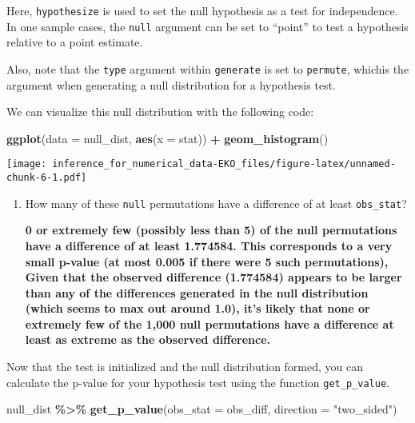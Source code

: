 \documentclass[
]{article}
\newenvironment{Shaded}{\begin{snugshade}}{\end{snugshade}}
\newcommand{\AttributeTok}[1]{\textcolor[rgb]{0.13,0.29,0.53}{#1}}
\newcommand{\FunctionTok}[1]{\textcolor[rgb]{0.13,0.29,0.53}{\textbf{#1}}}
\newcommand{\NormalTok}[1]{#1}
\newcommand{\SpecialCharTok}[1]{\textcolor[rgb]{0.81,0.36,0.00}{\textbf{#1}}}
\newcommand{\StringTok}[1]{\textcolor[rgb]{0.31,0.60,0.02}{#1}}
\begin{document}
Here, \texttt{hypothesize} is used to set the null hypothesis as a test
for independence. In one sample cases, the \texttt{null} argument can be
set to ``point'' to test a hypothesis relative to a point estimate.

Also, note that the \texttt{type} argument within \texttt{generate} is
set to \texttt{permute}, whichis the argument when generating a null
distribution for a hypothesis test.

We can visualize this null distribution with the following code:

\begin{Shaded}
\begin{Highlighting}[]
\FunctionTok{ggplot}\NormalTok{(}\AttributeTok{data =}\NormalTok{ null\_dist, }\FunctionTok{aes}\NormalTok{(}\AttributeTok{x =}\NormalTok{ stat)) }\SpecialCharTok{+}
  \FunctionTok{geom\_histogram}\NormalTok{()}
\end{Highlighting}
\end{Shaded}

\texttt{[image: inference\_for\_numerical\_data-EKO\_files/figure-latex/unnamed-chunk-6-1.pdf]}

\begin{enumerate}
\def\labelenumi{\arabic{enumi}.}
\setcounter{enumi}{5}
\item
  How many of these \texttt{null} permutations have a difference of at
  least \texttt{obs\_stat}?

  \textbf{0 or extremely few (possibly less than 5) of the null
  permutations have a difference of at least 1.774584. This corresponds
  to a very small p-value (at most 0.005 if there were 5 such
  permutations), Given that the observed difference (1.774584) appears
  to be larger than any of the differences generated in the null
  distribution (which seems to max out around 1.0), it's likely that
  none or extremely few of the 1,000 null permutations have a difference
  at least as extreme as the observed difference.}
\end{enumerate}

Now that the test is initialized and the null distribution formed, you
can calculate the p-value for your hypothesis test using the function
\texttt{get\_p\_value}.

\begin{Shaded}
\begin{Highlighting}[]
\NormalTok{null\_dist }\SpecialCharTok{\%\textgreater{}\%}
  \FunctionTok{get\_p\_value}\NormalTok{(}\AttributeTok{obs\_stat =}\NormalTok{ obs\_diff, }\AttributeTok{direction =} \StringTok{"two\_sided"}\NormalTok{)}
\end{Highlighting}
\end{Shaded}
\end{document}
